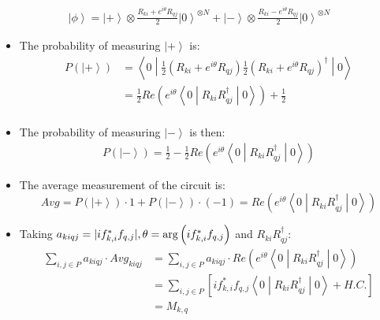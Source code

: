 \documentclass[professionalfonts]{beamer}
\newcommand{\ket}[1]{\ensuremath{\left|#1\right\rangle}}
\newcommand{\sandwich}[3]{\left< #1 \middle\vert #2 \middle\vert #3 \right>}
\newcommand{\paren}[1]{\left( #1 \right)}
\newcommand{\elec}{N}
\DeclarePairedDelimiter\abs{\lvert}{\rvert}
\begin{document}
\begin{frame}
\begin{equation*}
	\begin{split}
		\ket\phi = \ket + \otimes \frac{R_{ki} + e^{i\theta}R_{qj}}{2} \ket 0^{\otimes \elec}
		 + \ket - \otimes \frac{R_{ki} - e^{i\theta}R_{qj}}{2} \ket 0^{\otimes \elec}
	\end{split}
\end{equation*}
\begin{itemize}
	\item The probability of measuring $\ket +$ is:
\begin{equation*}
	\begin{split}
		P(\ket +)
		&= \sandwich 0 {
			\frac{1}{2}\paren{R_{ki} + e^{i\theta} R_{qj}}
			\frac{1}{2}\paren{R_{ki} + e^{i\theta} R_{qj}}^{\dagger}
		} 0 \\
		&= \frac 1 2 Re\paren{e^{i\theta}\sandwich 0 {
			 R_{ki}R_{qj}^{\dagger}
			} 0 }
			+ \frac{1}{2}\\
	\end{split}
\end{equation*}
	\item The probability of measuring $\ket -$ is then:
\begin{equation*}
	\begin{split}
		P(\ket -)
		= \frac 1 2 - \frac 1 2 Re\paren{e^{i\theta}\sandwich 0 {
			 R_{ki}R_{qj}^{\dagger}
	} 0 }
	\end{split}
\end{equation*}
\end{itemize}
\end{frame}

\begin{frame}
	\begin{itemize}
		\item The average measurement of the circuit is:
			$$Avg = P(\ket +) \cdot 1 + P(\ket -) \cdot (-1) = Re\paren{e^{i\theta}\sandwich 0 {R_{ki}R_{qj}^{\dagger}} 0}$$
		\item Taking $a_{kiqj} = \abs{if_{k, i}^*f_{q, j}}, \theta = \arg \paren{if_{k, i}^*f_{q, j}}$ and $R_{ki}R_{qj}^{\dagger}$:
\begin{equation*}
	\begin{split}
		\sum_{i, j \in P} a_{kiqj} \cdot Avg_{kiqj}
		&= \sum_{i, j \in P} a_{kiqj}\cdot Re\paren{e^{i\theta}\sandwich 0 {R_{ki}R_{qj}^{\dagger}} 0}\\
		&= \sum_{i, j \in P}
		\left [if_{k, i}^*f_{q, j}\sandwich 0 {R_{ki}R_{qj}^{\dagger}} 0 +
		H.C. \right ] \\ 
		&= M_{k, q} \\
	\end{split}
\end{equation*}
	\end{itemize}
\end{frame}
\end{document}

